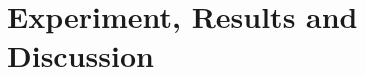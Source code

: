 \chapter{Experiment, Results and Discussion}
\minitoc
    
    \clearpage

    
    \clearpage

    
    \clearpage


